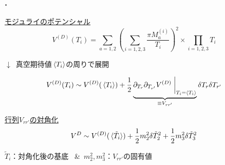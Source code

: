 \documentclass[
  a4paper,uplatex,dvipdfmx,11pt,
  xcolor = {dvipsnames,svgnames},
  hyperref ={colorlinks=true,citecolor=Navy,linkcolor=NavyBlue,urlcolor=purple}
]{beamer}
\begin{document}
\begin{frame}
  \frametitle{\thesection.\ \secname}

  \uline{モジュライのポテンシャル}
  \begin{equation}
    V^{(D)}(T_{i})
    =
    \sum_{a=1,2}
    \left(  
      \sum_{i=1,2,3}
      \frac{\pi M_{a}^{(i)}}{T_{i}}
    \right)^2
    \times
    \prod_{i=1,2,3}T_{i}
    \nonumber
  \end{equation}
  \begin{center}
    {\LARGE $\downarrow$}\ 真空期待値$\ev*{T_{i}}$の周りで展開
  \end{center}
  \begin{equation}
    V^{(D)}(T_{i})
    \sim
    V^{(D)}(\ev*{T_{i}})
    +
    \frac{1}{2}
    \underbrace{
      \partial_{T_{r}}\partial_{T_{r'}}V^{(D)}
      \left.\vphantom{\frac{1}{2}}\right|_{T_{i}=\ev*{T_{i}}}
    }_{\equiv V_{rr'}}
    \delta T_{r}\delta T_{r'}
    \nonumber
  \end{equation}

  \pause

  \uline{行列$V_{rr'}$の対角化}
  \begin{equation}    
    V^{D}
    \sim
    V^{(D)}(\ev*{\tilde{T}_{i}})
    +    
    \frac{1}{2}m_{2}^2 \delta \tilde{T}_{2}^2
    +
    \frac{1}{2}m_{3}^2 \delta \tilde{T}_{3}^2
    \nonumber
  \end{equation}
  \begin{center}
    $\tilde{T}_{i}$：対角化後の基底
    \ \&\ 
    $m_{2}^2,m_{3}^{2}$：$V_{rr'}$の固有値
  \end{center}
  
\end{frame}
\end{document}

